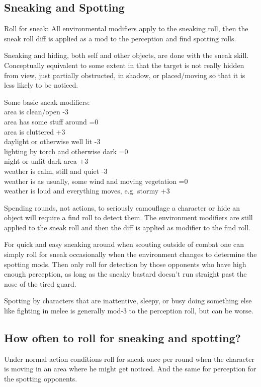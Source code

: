 \subsection*{Sneaking and Spotting}
Roll for sneak: All environmental modifiers apply to the sneaking roll, then the sneak roll diff is applied as a mod to the perception and find spotting rolls.

Sneaking and hiding, both self and other objects, are done with the sneak skill. Conceptually equivalent to some extent in that the target is not really hidden from view, just partially obstructed, in shadow, or placed/moving so that it is less likely to be noticed.

Some basic sneak modifiers:\\
area is clean/open -3\\
area has some stuff around =0\\
area is cluttered +3\\
daylight or otherwise well lit -3\\
lighting by torch and otherwise dark =0\\
night or unlit dark area +3\\
weather is calm, still and quiet -3\\
weather is as usually, some wind and moving vegetation =0\\
weather is loud and everything moves, e.g. stormy  +3

Spending rounds, not actions, to seriously camouflage a character or hide an object will require a find roll to detect them. The environment modifiers are still applied to the sneak roll and then the diff is applied as modifier to the find roll.

For quick and easy sneaking around when scouting outside of combat one can simply roll for sneak occasionally when the environment changes to determine the spotting mods. Then only roll for detection by those opponents who have high enough perception, as long as the sneaky bastard doesn't run straight past the nose of the tired guard.

Spotting by characters that are inattentive, sleepy, or busy doing something else like fighting in melee is generally mod-3 to the perception roll, but can be worse.


\subsection*{How often to roll for sneaking and spotting?}
Under normal action conditions roll for sneak once per round when the character is moving in an area where he might get noticed. And the same for perception for the spotting opponents.


